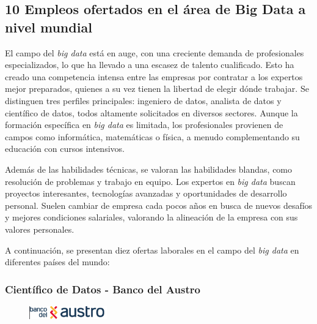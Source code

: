 \documentclass[12pt]{article}
\begin{document}
        \newpage



        \subsection{10 Empleos ofertados en el área de Big Data a nivel mundial}
            El campo del \emph{big data} está en auge, con una creciente demanda de profesionales especializados, lo que ha llevado a una escasez de talento cualificado. Esto ha creado una competencia intensa entre las empresas por contratar a los expertos mejor preparados, quienes a su vez tienen la libertad de elegir dónde trabajar. Se distinguen tres perfiles principales: ingeniero de datos, analista de datos y científico de datos, todos altamente solicitados en diversos sectores. Aunque la formación específica en \emph{big data} es limitada, los profesionales provienen de campos como informática, matemáticas o física, a menudo complementando su educación con cursos intensivos.
            
            Además de las habilidades técnicas, se valoran las habilidades blandas, como resolución de problemas y trabajo en equipo. Los expertos en \emph{big data} buscan proyectos interesantes, tecnologías avanzadas y oportunidades de desarrollo personal. Suelen cambiar de empresa cada pocos años en busca de nuevos desafíos y mejores condiciones salariales, valorando la alineación de la empresa con sus valores personales.
            
            A continuación, se presentan diez ofertas laborales en el campo del \emph{big data} en diferentes países del mundo:

            \subsubsection{Científico de Datos - Banco del Austro}

                \begin{figure}[!h]
                    \centering
                    \includegraphics[width=0.3\textwidth]{Recursos/Img/bancoAustroLogo.png}
                \end{figure}
\end{document}
